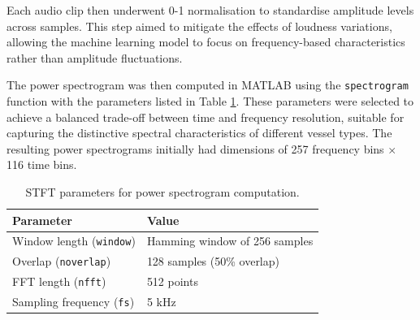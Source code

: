 Each audio clip then underwent 0-1 normalisation to standardise amplitude levels across samples. This step aimed to mitigate the effects of loudness variations, allowing the machine learning model to focus on frequency-based characteristics rather than amplitude fluctuations.

The power spectrogram was then computed in MATLAB using the \texttt{spectrogram} function with the parameters listed in Table \ref{tab:powerspectrogram-parameters}. These parameters were selected to achieve a balanced trade-off between time and frequency resolution, suitable for capturing the distinctive spectral characteristics of different vessel types. The resulting power spectrograms initially had dimensions of 257 frequency bins $\times$ 116 time bins.

\begin{table}[htbp]
    \centering
    \begin{tabular}{ll}
        \toprule
        \textbf{Parameter}   & \textbf{Value} \\ \midrule
        Window length (\texttt{window}) & Hamming window of 256 samples \\
        Overlap (\texttt{noverlap})     & 128 samples (50\% overlap) \\
        FFT length (\texttt{nfft})      & 512 points  \\
        Sampling frequency (\texttt{fs}) & 5 kHz  \\ \bottomrule
    \end{tabular}
    \caption{STFT parameters for power spectrogram computation.}
    \label{tab:powerspectrogram-parameters}
\end{table}

